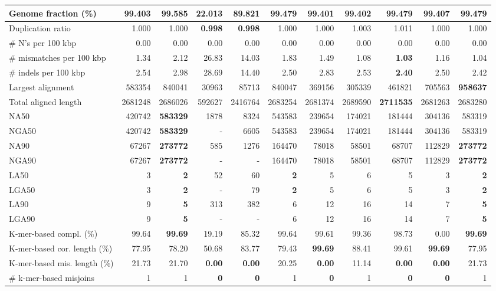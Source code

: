 \documentclass[12pt,a4paper]{article}
\begin{document}
\begin{table}[ht]
\begin{center}
\begin{tabular}{|l*{10}{|r}|}
Genome fraction (\%) & 99.403 & {\bf 99.585} & 22.013 & 89.821 & 99.479 & 99.401 & 99.402 & 99.479 & 99.407 & 99.479 \\ \hline
Duplication ratio & 1.000 & 1.000 & {\bf 0.998} & {\bf 0.998} & 1.000 & 1.000 & 1.003 & 1.011 & 1.000 & 1.000 \\ \hline
\# N's per 100 kbp & 0.00 & 0.00 & 0.00 & 0.00 & 0.00 & 0.00 & 0.00 & 0.00 & 0.00 & 0.00 \\ \hline
\# mismatches per 100 kbp & 1.34 & 2.12 & 26.83 & 14.03 & 1.83 & 1.49 & 1.08 & {\bf 1.03} & 1.16 & 1.04 \\ \hline
\# indels per 100 kbp & 2.54 & 2.98 & 28.69 & 14.40 & 2.50 & 2.83 & 2.53 & {\bf 2.40} & 2.50 & 2.42 \\ \hline
Largest alignment & 583354 & 840041 & 30963 & 85713 & 840047 & 369156 & 305339 & 461821 & 705563 & {\bf 958637} \\ \hline
Total aligned length & 2681248 & 2686026 & 592627 & 2416764 & 2683254 & 2681374 & 2689590 & {\bf 2711535} & 2681263 & 2683280 \\ \hline
NA50 & 420742 & {\bf 583329} & 1878 & 8324 & 543583 & 239654 & 174021 & 181444 & 304136 & 583319 \\ \hline
NGA50 & 420742 & {\bf 583329} & - & 6605 & 543583 & 239654 & 174021 & 181444 & 304136 & 583319 \\ \hline
NA90 & 67267 & {\bf 273772} & 585 & 1276 & 164470 & 78018 & 58501 & 68707 & 112829 & {\bf 273772} \\ \hline
NGA90 & 67267 & {\bf 273772} & - & - & 164470 & 78018 & 58501 & 68707 & 112829 & {\bf 273772} \\ \hline
LA50 & 3 & {\bf 2} & 52 & 60 & {\bf 2} & 5 & 6 & 5 & 3 & {\bf 2} \\ \hline
LGA50 & 3 & {\bf 2} & - & 79 & {\bf 2} & 5 & 6 & 5 & 3 & {\bf 2} \\ \hline
LA90 & 9 & {\bf 5} & 313 & 382 & 6 & 12 & 16 & 14 & 7 & {\bf 5} \\ \hline
LGA90 & 9 & {\bf 5} & - & - & 6 & 12 & 16 & 14 & 7 & {\bf 5} \\ \hline
K-mer-based compl. (\%) & 99.64 & {\bf 99.69} & 19.19 & 85.32 & 99.64 & 99.61 & 99.36 & 98.73 & 0.00 & {\bf 99.69} \\ \hline
K-mer-based cor. length (\%) & 77.95 & 78.20 & 50.68 & 83.77 & 79.43 & {\bf 99.69} & 88.41 & 99.61 & {\bf 99.69} & 77.95 \\ \hline
K-mer-based mis. length (\%) & 21.73 & 21.70 & {\bf 0.00} & {\bf 0.00} & 20.25 & {\bf 0.00} & 11.14 & {\bf 0.00} & {\bf 0.00} & 21.73 \\ \hline
\# k-mer-based misjoins & 1 & 1 & {\bf 0} & {\bf 0} & 1 & {\bf 0} & 1 & {\bf 0} & {\bf 0} & 1 \\ \hline
\end{tabular}
\end{center}
\end{table}
\end{document}

